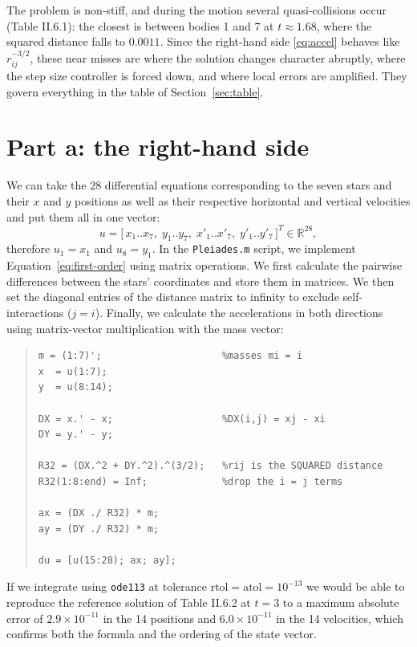 \documentclass[11pt]{article}
\newcommand{\code}[1]{\texttt{#1}}
\begin{document}
The problem is non-stiff, and during the motion several quasi-collisions
occur (Table II.6.1): the closest is between bodies 1 and 7 at $t \approx 1.68$,
where the squared distance falls to $0.0011$. Since the right-hand side
\eqref{eq:accel} behaves like $r_{ij}^{-3/2}$, these near misses are where the
solution changes character abruptly, where the step size controller is forced
down, and where local errors are amplified. They govern everything in the table
of Section~\ref{sec:table}.

\section{Part a: the right-hand side}

We can take the $28$ differential equations corresponding to the seven stars and their 
$x$ and $y$ positions as well as their respective horizontal and vertical velocities and put them all in one vector:
\[
u = \bigl[\,x_1..x_7,\; y_1..y_7,\; x'_1..x'_7,\; y'_1..y'_7\,\bigr]^{T} \in \mathbb{R}^{28},
\]
therefore $u_1 = x_1$ and $u_8 = y_1$. In the \texttt{Pleiades.m} script, we implement
Equation~\ref{eq:first-order} using matrix operations.
We first calculate the pairwise differences between
the stars' coordinates and store them in matrices.
We then set the diagonal entries of the distance
matrix to infinity to exclude self-interactions
($j=i$). Finally, we calculate the accelerations
in both directions using matrix-vector multiplication
with the mass vector:

\begin{quote}
\begin{verbatim}
m = (1:7)';                     %masses mi = i
x  = u(1:7);
y  = u(8:14);

DX = x.' - x;                   %DX(i,j) = xj - xi
DY = y.' - y;

R32 = (DX.^2 + DY.^2).^(3/2);   %rij is the SQUARED distance
R32(1:8:end) = Inf;             %drop the i = j terms

ax = (DX ./ R32) * m;
ay = (DY ./ R32) * m;

du = [u(15:28); ax; ay];
\end{verbatim}
\end{quote}

If we integrate using \code{ode113} at tolerance
$\text{rtol} = \text{atol} = 10^{-13}$ we would be able to reproduce the reference solution of
Table II.6.2 at $t = 3$ to a maximum absolute error of
$2.9 \times 10^{-11}$ in the 14 positions and $6.0 \times 10^{-11}$ in the 14
velocities, which confirms both the formula and the ordering of the state vector.
\end{document}
